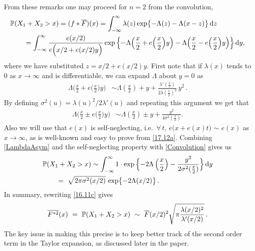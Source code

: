 From these remarks one may proceed for $n=2$
from the convolution,
\begin{align} \label{Convolution}
	\nonumber \MoveEqLeft \Prob(X_1 + X_2 >x) = (f \ast \Fb)(x)
	= \int_{-\infty}^\infty\lambda(z) \exp\bigl\{-\Lambda(z)-\Lambda(x-z)\bigr\}\,\dd z \\
	&= \int_{-\infty}^\infty
	\frac{ e(x/2) }{ e\Big(x/2 + e(x/2)y \Big)  } \exp \Big\{ {-} \Lambda \Big(\frac{x}{2} + e\Big(\frac{x}{2}\Big) y \Big)-\Lambda \Big(\frac{x}{2}- e\Big(\frac{x}{2}\Big) y \Big) \Big\} \,\dd y,
\end{align} %
where we have substituted $z=x/2+e(x/2) y$. First note that if $\lambda(x)$ tends to 0 as $x\to \infty$ and is differentiable, we can expand $\Lambda$ about $y=0$ as
\begin{align*}
	\Lambda \Big(\frac{x}{2} + e\Big(\frac{x}{2}\Big) y \Big) &\sim \Lambda \left(\frac{x}{2}\right) + y +\frac{\lambda '\left(\frac{x}{2}\right)}{2 \lambda \left(\frac{x}{2}\right)^2} \,y^2 \,.
\end{align*}
By defining $\sigma^2(u)=\lambda(u)^2/2\lambda'(u)$ and repeating this argument we get that
\begin{align} \label{LambdaAsym}
	\Lambda \Big(\frac{x}{2} \pm e\Big(\frac{x}{2}\Big) y \Big) &\sim \Lambda \left(\frac{x}{2}\right) \pm y +\frac{y^2}{4 \sigma^2(\frac{x}{2})}.
\end{align}
Also we will use that $e(x)$ is self-neglecting, i.e.\ $\forall\, t$, $e\bigl(x+e(x)t\bigr)$ $\sim$ $e(x)$ as $x\to\infty$, as is well-known and easy to prove from \eqref{17.12a}.
Combining \eqref{LambdaAsym} and the self-neglecting property with \eqref{Convolution} gives us
\begin{align}\nonumber \MoveEqLeft
\Prob(X_1+X_2>x) \sim \int_{-\infty}^\infty 1 \cdot \exp \Big\{ {-}2 \Lambda \left(\frac{x}{2}\right) - \frac{y^2}{2 \sigma^2(\frac{x}{2})} \Big\} \,\dd y \\
\label{16.11c}&=\ \sqrt{2\pii\sigma^2(x/2)} \, \exp\bigl\{-2\Lambda(x/2)\bigr\} \,.
\end{align}
In summary, rewriting \eqref{16.11c} gives
\begin{equation}\label{17.12b}
\overline{F^{*2}}(x)\ =\ \mathbb{P}(X_1+X_2>x)\ \sim\ \overline F(x/2)^2\sqrt{\pi \frac{\lambda(x/2)^2}{\lambda'(x/2)}}\,.
\end{equation}
The key issue in making this precise is to keep better track of the second order term in the Taylor
expansion, as discussed later in the paper.

